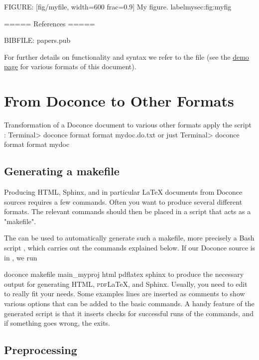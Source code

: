 \documentclass[%
oneside,                 %
final,                   %
10pt]{article}
\begin{document}
FIGURE: [fig/myfile, width=600 frac=0.9] My figure. label{mysec:fig:myfig}

===== References =====

BIBFILE: papers.pub
\eccq

For further details on functionality and
syntax we refer to the  file (see the
\href{{https://doconce.googlecode.com/hg/doc/demos/manual/index.html}}{demo page}
for various formats of this document).




\section{From Doconce to Other Formats}
\label{doconce2formats}

Transformation of a Doconce document  to various other
formats apply the script :
\bsys
Terminal> doconce format format mydoc.do.txt
\esys
or just
\bsys
Terminal> doconce format format mydoc
\esys

\subsection{Generating a makefile}

Producing HTML, Sphinx, and in particular {\LaTeX} documents from
Doconce sources requires a few commands. Often you want to
produce several different formats. The relevant commands should
then be placed in a script that acts as a "makefile".

The  can be used to automatically generate
such a makefile, more precisely a Bash script , which
carries out the commands explained below. If our Doconce source
is in , we run

\bsys
doconce makefile main_myproj html pdflatex sphinx
\esys
to produce the necessary output for generating HTML, \textsc{pdf}{\LaTeX}, and
Sphinx. Usually, you need to edit  to really fit your
needs. Some examples lines are inserted as comments to show
various options that can be added to the basic commands.
A handy feature of the generated  script is that it
inserts checks for successful runs of the  commands,
and if something goes wrong, the  exits.


\subsection{Preprocessing}
\end{document}
